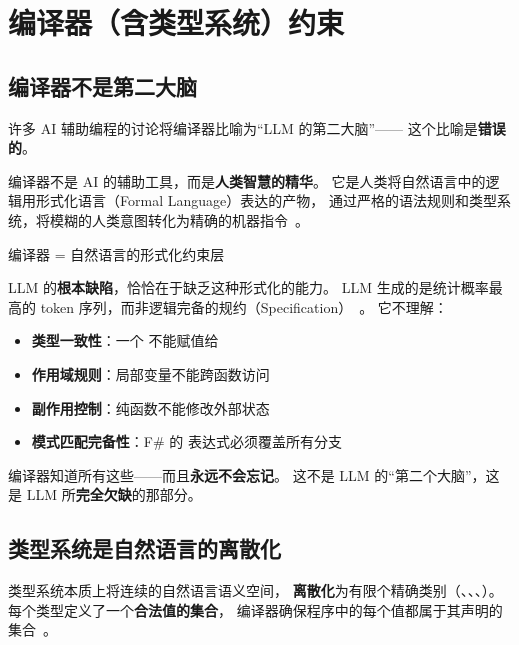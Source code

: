 \documentclass[10pt, openany]{book}
\begin{document}
\chapter{编译器（含类型系统）约束}

\section{编译器不是第二大脑}

许多 AI 辅助编程的讨论将编译器比喻为``LLM 的第二大脑''——
这个比喻是\textbf{错误的}。

编译器不是 AI 的辅助工具，而是\textbf{人类智慧的精华}。
它是人类将自然语言中的逻辑用形式化语言（Formal Language）表达的产物，
通过严格的语法规则和类型系统，将模糊的人类意图转化为精确的机器指令~\cite{Aho2006Compilers}。

\begin{framed}
\centering
\large 编译器 = 自然语言的形式化约束层
\end{framed}

\noindent LLM 的\textbf{根本缺陷}，恰恰在于缺乏这种形式化的能力。
LLM 生成的是统计概率最高的 token 序列，而非逻辑完备的规约（Specification）~\cite{Vaswani2017Attention}。
它不理解：
\begin{itemize}
    \item \textbf{类型一致性}：一个  不能赋值给 
    \item \textbf{作用域规则}：局部变量不能跨函数访问
    \item \textbf{副作用控制}：纯函数不能修改外部状态
    \item \textbf{模式匹配完备性}：F\# 的  表达式必须覆盖所有分支
\end{itemize}

编译器知道所有这些——而且\textbf{永远不会忘记}。
这不是 LLM 的``第二个大脑''，这是 LLM 所\textbf{完全欠缺}的那部分。

\section{类型系统是自然语言的离散化}

\begin{definition}[类型即约束]
类型系统本质上将连续的自然语言语义空间，
\textbf{离散化}为有限个精确类别（、、、）。
每个类型定义了一个\textbf{合法值的集合}，
编译器确保程序中的每个值都属于其声明的集合~\cite{Pierce2002TAPL}。
\end{definition}
\end{document}
